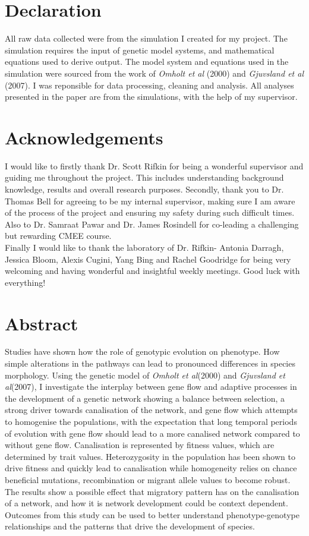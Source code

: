 \documentclass[11pt]{article}
\begin{document}


\newpage

\section{Declaration}
All raw data collected were from the simulation I created for my project. The simulation requires the input of genetic model systems, and mathematical equations used to derive output. The model system and equations used in the simulation were sourced from the work of \textit{Omholt et al} (2000) and \textit{Gjuvsland et al} (2007). I was reponsible for data processing, cleaning and analysis. All analyses presented in the paper are from the simulations, with the help of my supervisor.

\section{Acknowledgements}
I would like to firstly thank Dr. Scott Rifkin for being a wonderful supervisor and guiding me throughout the project. This includes understanding background knowledge, results and overall research purposes. Secondly, thank you to Dr. Thomas Bell for agreeing to be my internal supervisor, making sure I am aware of the process of the project and ensuring my safety during such difficult times. Also to Dr. Samraat Pawar and Dr. James Rosindell for co-leading a challenging but rewarding CMEE course.
\\Finally I would like to thank the laboratory of Dr. Rifkin- Antonia Darragh, Jessica Bloom, Alexis Cugini, Yang Bing and Rachel Goodridge for being very welcoming and having wonderful and insightful weekly meetings. Good luck with everything!

\newpage

\section{Abstract}
Studies have shown how the role of genotypic evolution on phenotype. How simple alterations in the pathways can lead to pronounced differences in species morphology. Using the genetic model of \textit{Omholt et al}(2000) and \textit{Gjuvsland et al}(2007), I investigate the interplay between gene flow and adaptive processes in the development of a genetic network showing a balance between selection, a strong driver towards canalisation of the network, and gene flow which attempts to homogenise the populations, with the expectation that long temporal periods of evolution with gene flow should lead to a more canalised network compared to without gene flow. Canalisation is represented by fitness values, which are determined by trait values. Heterozygosity in the population has been shown to drive fitness and quickly lead to canalisation while homogeneity relies on chance beneficial mutations, recombination or migrant allele values to become robust. The results show a possible effect that migratory pattern has on the canalisation of a network, and how it is network development could be context dependent. Outcomes from this study can be used to better understand phenotype-genotype relationships and the patterns that drive the development of species.
\end{document}
